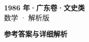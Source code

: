 \documentclass[zihao=-4, a4paper]{ctexart}
\begin{document}
\begin{center}
  {\Large\bfseries 1986 年·广东卷·文史类}\\[4pt]
  {\large 数学 · 解析版}
\end{center}
\medskip
{}

\clearpage
{}
\begin{center}{\Large\bfseries 参考答案与详细解析}\end{center}
\medskip

\end{document}
